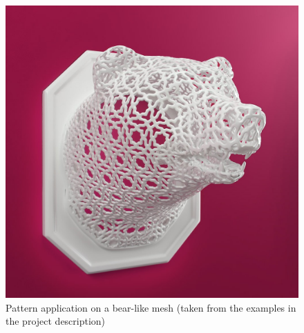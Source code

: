 \documentclass[10pt,conference,compsocconf]{IEEEtran}
\begin{document}
\begin{figure}[tbp]
	\centering
	\includegraphics[width=\columnwidth]{3d-printed-lamps-animal-lace-bear}
	\caption{Pattern application on a bear-like mesh (taken from the examples in the project description)}
	\vspace{-3mm}
	\label{fig:bear}
\end{figure}
\end{document}
